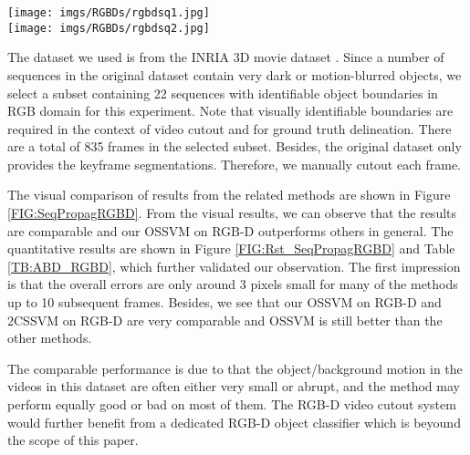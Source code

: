 \documentclass[10pt,journal,compsoc]{newIEEEtran}
\begin{document}
\begin{table*}
\end{table*}\begin{figure*}[!t]
	\centering
	\texttt{[image: imgs/RGBDs/rgbdsq1.jpg]}\\
	\texttt{[image: imgs/RGBDs/rgbdsq2.jpg]}
	\caption{Segmentation results on two RGB-D sequences (zoom in to see details). In each example, the left most is the initial keyframe segmentation. From the second left to the end are the results by Zhong et al.'s classifier \cite{Zhong2012UDC_SIGGRAPHAsia}, Classifier with Matting, OSSVM with RGB only, uniform weights for GC on RGB-D, 2CSSVM for RGB-D and OSSVM for RGB-D. The top row shows the result on the 5th frame from the keyframe, and the bottom row shows the zoom-in for the boxed regions in the top row.}\label{FIG:SeqPropagRGBD}\vspace{-0.5cm}
\end{figure*}

The dataset we used is from the INRIA 3D movie dataset \cite{Seguin153DMovie}. Since a number of sequences in the original dataset contain very dark or motion-blurred objects, we select a subset containing 22 sequences with identifiable object boundaries in RGB domain for this experiment. Note that visually identifiable boundaries are required in the context of video cutout and for ground truth delineation. There are a total of 835 frames in the selected subset. Besides, the original dataset only provides the keyframe segmentations. Therefore, we manually cutout each frame. 

The visual comparison of results from the related methods are shown in Figure \ref{FIG:SeqPropagRGBD}. From the visual results, we can observe that the results are comparable and our OSSVM on RGB-D outperforms others in general. The quantitative results are shown in Figure \ref{FIG:Rst_SeqPropagRGBD} and Table \ref{TB:ABD_RGBD}, which further validated our observation. The first impression is that the overall errors are only around 3 pixels small for many of the methods up to 10 subsequent frames. Besides, we see that our OSSVM on RGB-D and 2CSSVM on RGB-D are very comparable and OSSVM is still better than the other methods. 

The comparable performance is due to that the object/background motion in the videos in this dataset are often either very small or abrupt, and the method may perform equally good or bad on most of them. The RGB-D video cutout system would further benefit from a dedicated RGB-D object classifier which is beyound the scope of this paper.
\end{document}
